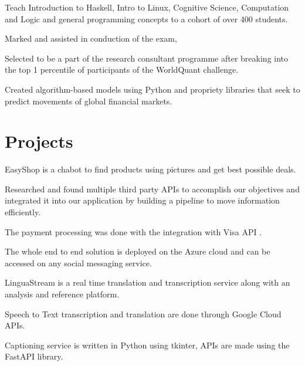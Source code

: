 \documentclass[]{deedy-resume-openfont}
\begin{document}
\begin{minipage}[t]{0.66\textwidth}
\begin{tightemize}
\item Teach Introduction to Haskell, Intro to Linux, Cognitive Science, Computation and Logic and general programming concepts to a cohort of over 400 students.
\item Marked and assisted in conduction of the exam,
\end{tightemize}
\sectionsep

\begin{tightemize}
\item Selected to be a part of the research consultant programme after breaking into the top 1 percentile of participants of the WorldQuant challenge.
\item Created algorithm-based models using Python and propriety libraries that seek to predict movements of global financial markets.
\end{tightemize}
\sectionsep




\section{Projects}
\begin{tightemize}
\item EasyShop is a chabot to find products using pictures and get best possible deals.
\item Researched and found multiple third party APIs to accomplish our objectives and integrated it into our application by building a pipeline to move information efficiently.
\item The payment processing was done with the integration with Visa API .
\item The whole end to end solution is deployed on the Azure cloud and can be accessed on any social messaging service. 
\end{tightemize}
\sectionsep

\begin{tightemize}
\item LinguaStream is a real time translation and transcription service along with an analysis and reference platform.
\item Speech to Text transcription and translation are done through Google Cloud APIs.
\item Captioning service is written in Python using tkinter, APIs are made using the FastAPI library.
\end{tightemize}
\sectionsep



\end{minipage}
\end{document}
